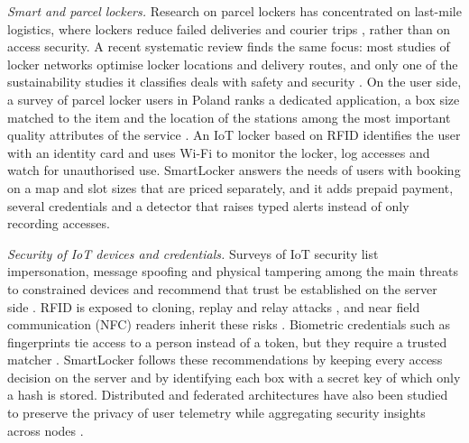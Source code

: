\textit{Smart and parcel lockers.} Research on parcel lockers has concentrated on last-mile logistics, where lockers
reduce failed deliveries and courier trips \cite{iwan2016parcel}, rather than on access security. A recent systematic
review finds the same focus: most studies of locker networks optimise locker locations and delivery routes, and only
one of the sustainability studies it classifies deals with safety and security \cite{zhang2025parcel}. On the user
side, a survey of parcel locker users in Poland ranks a dedicated application, a box size matched to the item and the
location of the stations among the most important quality attributes of the service \cite{ciesla2023parcel}. An IoT
locker based on RFID \cite{rfidiot2023locker} identifies the user with an identity card and uses Wi-Fi to monitor the
locker, log accesses and watch for unauthorised use. SmartLocker answers the needs of users with booking on a map and
slot sizes that are priced separately, and it adds prepaid payment, several credentials and a detector that raises
typed alerts instead of only recording accesses.

\textit{Security of IoT devices and credentials.} Surveys of IoT security list impersonation, message spoofing and
physical tampering among the main threats to constrained devices \cite{abomhara2015cyber} and recommend that trust be
established on the server side \cite{sicari2015security}. RFID \cite{want2006rfid} is exposed to cloning, replay and
relay attacks \cite{mitrokotsa2010rfid}, and near field communication (NFC) readers inherit these risks
\cite{coskun2013nfc}. Biometric credentials such as fingerprints tie access to a person instead of a token, but they
require a trusted matcher \cite{jain2004biometric}. SmartLocker follows these recommendations by keeping every access
decision on the server and by identifying each box with a secret key of which only a hash is stored. Distributed and
federated architectures have also been studied to preserve the privacy of user telemetry while aggregating security
insights across nodes \cite{shahin2025twostage}.


